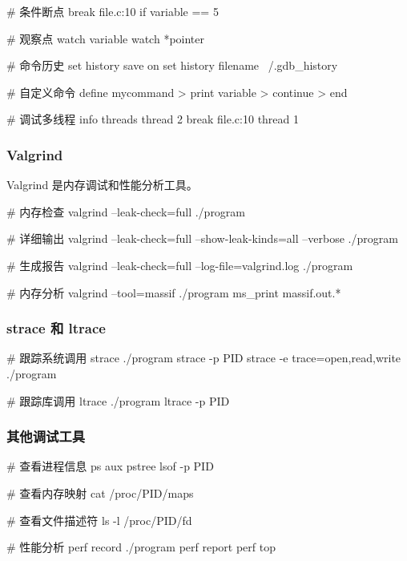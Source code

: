 
\begin{lstcode}[numbers=none]
  # 条件断点
  break file.c:10 if variable == 5

  # 观察点
  watch variable
  watch *pointer

  # 命令历史
  set history save on
  set history filename ~/.gdb_history

  # 自定义命令
  define mycommand
  > print variable
  > continue
  > end

  # 调试多线程
  info threads
  thread 2
  break file.c:10 thread 1
\end{lstcode}

\subsubsection{Valgrind}

Valgrind 是内存调试和性能分析工具。


\begin{lstcode}[numbers=none]
  # 内存检查
  valgrind --leak-check=full ./program

  # 详细输出
  valgrind --leak-check=full --show-leak-kinds=all --verbose ./program

  # 生成报告
  valgrind --leak-check=full --log-file=valgrind.log ./program

  # 内存分析
  valgrind --tool=massif ./program
  ms_print massif.out.*
\end{lstcode}

\subsubsection{strace 和 ltrace}


\begin{lstcode}[numbers=none]
  # 跟踪系统调用
  strace ./program
  strace -p PID
  strace -e trace=open,read,write ./program

  # 跟踪库调用
  ltrace ./program
  ltrace -p PID
\end{lstcode}

\subsubsection{其他调试工具}


\begin{lstcode}[numbers=none]
  # 查看进程信息
  ps aux
  pstree
  lsof -p PID

  # 查看内存映射
  cat /proc/PID/maps

  # 查看文件描述符
  ls -l /proc/PID/fd

  # 性能分析
  perf record ./program
  perf report
  perf top
\end{lstcode}

